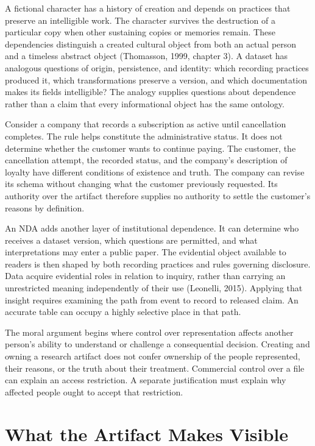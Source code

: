 \noindent \noindent A fictional character has a history of creation and depends on
practices that preserve an intelligible work. The character survives the
destruction of a particular copy when other sustaining copies or
memories remain. These dependencies distinguish a created cultural
object from both an actual person and a timeless abstract object
(Thomasson, 1999, chapter 3). A dataset has analogous questions of
origin, persistence, and identity: which recording practices produced
it, which transformations preserve a version, and which documentation
makes its fields intelligible? The analogy supplies questions about
dependence rather than a claim that every informational object has the
same ontology.

Consider a company that records a subscription as active until
cancellation completes. The rule helps constitute the administrative
status. It does not determine whether the customer wants to continue
paying. The customer, the cancellation attempt, the recorded status, and
the company's description of loyalty have different conditions of
existence and truth. The company can revise its schema without changing
what the customer previously requested. Its authority over the artifact
therefore supplies no authority to settle the customer's reasons by
definition.

An NDA adds another layer of institutional dependence. It can determine
who receives a dataset version, which questions are permitted, and what
interpretations may enter a public paper. The evidential object
available to readers is then shaped by both recording practices and
rules governing disclosure. Data acquire evidential roles in relation to
inquiry, rather than carrying an unrestricted meaning independently of
their use (Leonelli, 2015). Applying that insight requires examining the
path from event to record to released claim. An accurate table can
occupy a highly selective place in that path.

The moral argument begins where control over representation affects
another person's ability to understand or challenge a consequential
decision. Creating and owning a research artifact does not confer
ownership of the people represented, their reasons, or the truth about
their treatment. Commercial control over a file can explain an access
restriction. A separate justification must explain why affected people
ought to accept that restriction.


\hypertarget{M09-what-the-artifact-makes-visible}{%
\section{What the Artifact Makes
Visible}\label{M09-what-the-artifact-makes-visible}}

